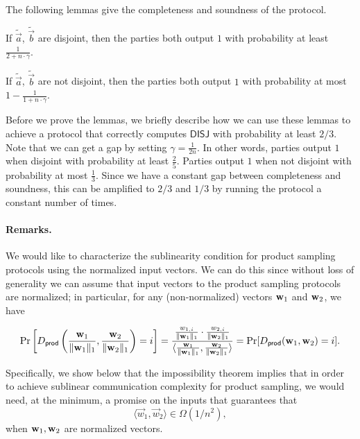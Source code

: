 \noindent
The following lemmas give the completeness and soundness of the protocol.

\begin{lemma} \label{clm:completeness} If $\tilde{\vec{a}}$,
$\tilde{\vec{b}}$ are disjoint, then the parties both output $1$ with
probability at least $\frac{1}{2 + n \cdot \gamma}$.  
\end{lemma}

\begin{lemma}  \label{clm:soundness}
If $\tilde{\vec{a}}$, $\tilde{\vec{b}}$ are not disjoint, then the
parties both output $1$ with probability at most $1-\frac{1}{1 + n \cdot
\gamma}$.  
\end{lemma}

Before we prove the lemmas, we briefly describe how we can use these
lemmas to achieve a protocol that correctly computes $\mathsf{DISJ}$
with probability at least $2/3$. 
%
Note that we can get a gap by setting $\gamma = \frac{1}{2n}$.  In other
words, parties output $1$ when disjoint with probability at least
$\frac{2}{5}$.  Parties output $1$ when not disjoint with probability at
most $\frac{1}{3}$. Since we have a constant gap between completeness
and soundness, this can be amplified to $2/3$ and $1/3$ by running the
protocol a constant number of times.

\paragraph{Remarks.}
We would like to characterize the sublinearity condition for product
sampling protocols using the normalized input vectors.  We can do this
since without loss of generality we can assume that input vectors to the
product sampling protocols are normalized; in particular, for any
(non-normalized) vectors $\mathbf{w}_1$ and $\mathbf{w}_2$, we have 

\[
\Pr\left[D_{\mathsf{prod}}\left(\frac{\mathbf{w}_1}{\|\mathbf{w}_1\|_1},\frac{\mathbf{w}_2}{\|\mathbf{w}_2\|_1}\right)=i\right]
= 
\frac{ \frac{w_{1,i}}{\|\mathbf{w}_1\|_1} \cdot
\frac{w_{2,i}}{\|\mathbf{w}_2\|_1}}{
  \langle \frac{\mathbf{w}_1}{\|\mathbf{w}_1\|_1}, \frac{\mathbf{w}_2}{\|\mathbf{w}_2\|_1}
     \rangle} = \Pr[D_{\mathsf{prod}}(\mathbf{w}_1,\mathbf{w}_2)=i].
\]

Specifically, we show below that the impossibility theorem implies that
in order to achieve sublinear communication complexity for product
sampling, we would need, at the minimum, a promise on the inputs that
guarantees that $$\langle \vec{w}_1, \vec{w}_2 \rangle \in
\Omega(1/n^2),$$ when $\mathbf{w}_1, \mathbf{w}_2$ are normalized vectors. 

